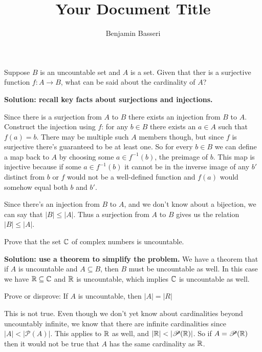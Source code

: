 \documentclass{article}
\title{Your Document Title}
\author{Benjamin Basseri}
\begin{document}
\maketitle

\begin{problem}
Suppose $B$ is an uncountable set and $A$ is a set. Given that ther is a surjective function $f: A \to B$, what can be said about the cardinality of $A$?
\end{problem}

\textbf{Solution: recall key facts about surjections and injections.}

Since there is a surjection from $A$ to $B$ there exists an injection from $B$ to $A$. Construct the injection using $f$: for any $b \in B$ there exists an $a \in A$ such that $f(a) = b$. There may be multiple such $A$ members though, but since $f$ is surjective there's guaranteed to be at least one. So for every $b \in B$ we can define a map back to $A$ by choosing some $a \in f^{-1}(b)$, the preimage of $b$. This map is injective because if some $a \in f^{-1}(b)$ it cannot be in the inverse image of any $b'$ distinct from $b$ or $f$ would not be a well-defined function and $f(a)$ would somehow equal both $b$ and $b'$.

Since there's an injection from $B$ to $A$, and we don't know about a bijection, we can say that $|B| \leq |A|$. Thus a surjection from $A$ to $B$ gives us the relation $|B| \leq |A|$.

\begin{problem}
Prove that the set $\mathbb{C}$ of complex numbers is uncountable.
\end{problem}

\textbf{Solution: use a theorem to simplify the problem.} We have a theorem that if $A$ is uncountable and $A \subseteq B$, then $B$ must be uncountable as well. In this case we have $\mathbb{R} \subseteq \mathbb{C}$ and $\mathbb{R}$ is uncountable, which implies $\mathbb{C}$ is uncountable as well.

\begin{problem}
Prove or disprove: If $A$ is uncountable, then $|A| = |R|$
\end{problem}

This is not true. Even though we don't yet know about cardinalities beyond uncountably infinite, we know that there are infinite cardinalities since $|A| < |\mathscr{P}(A)|$. This applies to $\mathbb{R}$ as well, and $|\mathbb{R}| < |\mathscr{P}(\mathbb{R})|$. So if $A = \mathscr{P}(\mathbb{R})$ then it would not be true that $A$ has the same cardinality as $\mathbb{R}$.
\end{document}
